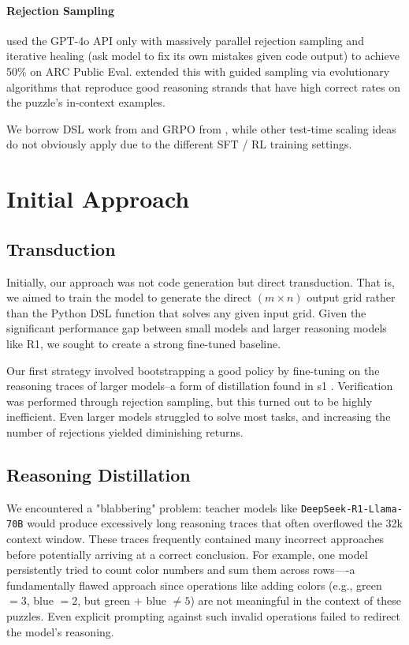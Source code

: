 \documentclass{article}
\begin{document}
\paragraph{Rejection Sampling} \cite{Greenblatt} used the GPT-4o API only with massively parallel rejection sampling and iterative healing (ask model to fix its own mistakes given code output) to achieve 50\% on ARC Public Eval. \cite{Jeremy} extended this with guided sampling via evolutionary algorithms that reproduce good reasoning strands that have high correct rates on the puzzle's in-context examples.

We borrow DSL work from \cite{Hodel} and GRPO from \cite{GRPO}, while other test-time scaling ideas do not obviously apply due to the different SFT / RL training settings.

\section{Initial Approach}

\subsection{Transduction}

Initially, our approach was not code generation but direct transduction. That is, we aimed to train the model to generate the direct $(m \times n)$ output grid rather than the Python DSL function that solves any given input grid. Given the significant performance gap between small models and larger reasoning models like R1, we sought to create a strong fine-tuned baseline.

Our first strategy involved bootstrapping a good policy by fine-tuning on the reasoning traces of larger models--a form of distillation found in s1 \cite{s1}. Verification was performed through rejection sampling, but this turned out to be highly inefficient. Even larger models struggled to solve most tasks, and increasing the number of rejections yielded diminishing returns.

\subsection{Reasoning Distillation}

We encountered a "blabbering" problem: teacher models like \texttt{DeepSeek-R1-Llama-70B} would produce excessively long reasoning traces that often overflowed the 32k context window. These traces frequently contained many incorrect approaches before potentially arriving at a correct conclusion. For example, one model persistently tried to count color numbers and sum them across rows—-a fundamentally flawed approach since operations like adding colors (e.g., green $=3$, blue $=2$, but green $+$ blue $\neq 5$) are not meaningful in the context of these puzzles. Even explicit prompting against such invalid operations failed to redirect the model's reasoning.
\end{document}
